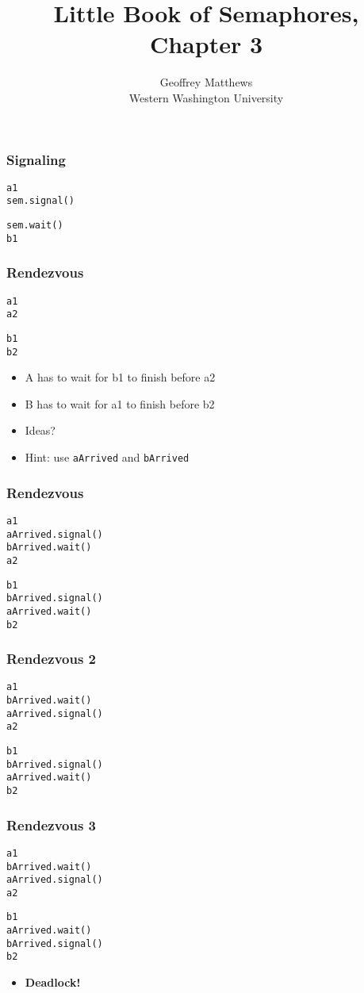 \documentclass{beamer}
\title{Little Book of Semaphores, Chapter 3}
\author{Geoffrey Matthews\\
\small Western Washington University}
\newcommand{\bi}{\begin{itemize}}
\newcommand{\ii}{\item}
\newcommand{\ei}{\end{itemize}}
\newcommand{\bfr}[1]{\begin{frame}[fragile]\frametitle{{ #1 }}}
\begin{document}
\maketitle

\bfr{Signaling}
\begin{multicols}{2}
\begin{Verbatim}[label=Thread A]
a1
sem.signal()
\end{Verbatim}
\begin{Verbatim}[label=Thread B]
sem.wait()
b1
\end{Verbatim}
\end{multicols}
\end{frame}

\bfr{Rendezvous}
\begin{multicols}{2}
\begin{Verbatim}[label=Thread A]
a1
a2
\end{Verbatim}
\begin{Verbatim}[label=Thread B]
b1
b2
\end{Verbatim}
\end{multicols}
\bi
\ii A has to wait for b1 to finish before a2
\ii B has to wait for a1 to finish before b2
\ii Ideas?
\pause
\ii Hint: use {\tt aArrived} and {\tt bArrived}
\ei
\end{frame}

\bfr{Rendezvous}
\begin{multicols}{2}
\begin{Verbatim}[label=Thread A]
a1
aArrived.signal()
bArrived.wait()
a2
\end{Verbatim}
\begin{Verbatim}[label=Thread B]
b1
bArrived.signal()
aArrived.wait()
b2
\end{Verbatim}
\end{multicols}
\end{frame}

\bfr{Rendezvous 2}
\begin{multicols}{2}
\begin{Verbatim}[label=Thread A]
a1
bArrived.wait()
aArrived.signal()
a2
\end{Verbatim}
\begin{Verbatim}[label=Thread B]
b1
bArrived.signal()
aArrived.wait()
b2
\end{Verbatim}
\end{multicols}
\end{frame}

\bfr{Rendezvous 3}
\begin{multicols}{2}
\begin{Verbatim}[label=Thread A]
a1
bArrived.wait()
aArrived.signal()
a2
\end{Verbatim}
\begin{Verbatim}[label=Thread B]
b1
aArrived.wait()
bArrived.signal()
b2
\end{Verbatim}
\end{multicols}
\bi
\ii {\bf Deadlock!}
\ei
\end{frame}
\end{document}
